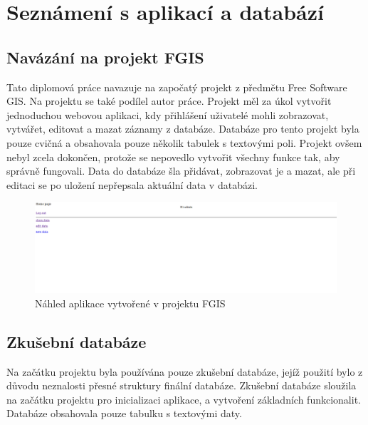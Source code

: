 \chapter{Seznámení s aplikací a databází}
\label{3-seznameni-s-aplikaci-a-databazi}

\section{Navázání na projekt FGIS}

Tato diplomová práce navazuje na započatý projekt z předmětu Free
Software GIS. Na projektu se také podílel autor práce. 
Projekt měl za úkol vytvořit jednoduchou webovou aplikaci, kdy
přihlášení uživatelé mohli zobrazovat, vytvářet, editovat a mazat záznamy
z databáze. Databáze pro tento projekt byla pouze cvičná a obsahovala
pouze několik tabulek s textovými poli. Projekt ovšem nebyl zcela
dokončen, protože se nepovedlo vytvořit všechny funkce tak, aby
správně fungovali. Data do databáze šla přidávat, zobrazovat je a 
mazat, ale při editaci se po uložení nepřepsala aktuální data v
databázi.

\begin{figure}[H] \centering
    \includegraphics[width=400pt]{./pictures/4-nahled-menu-fgis.PNG}
    \caption[Náhled aplikace vytvořené v projektu FGIS]{Náhled aplikace vytvořené v projektu FGIS}
	\label{fig:Náhled aplikace}              
\end{figure}
 
 \section{Zkušební databáze}
 
Na začátku projektu byla používána pouze zkušební databáze, jejíž použití 
bylo z důvodu neznalosti přesné struktury finální databáze. Zkušební databáze 
sloužila na začátku projektu pro inicializaci aplikace, a vytvoření základních 
funkcionalit. Databáze obsahovala pouze tabulku s textovými daty.

 \newpage

